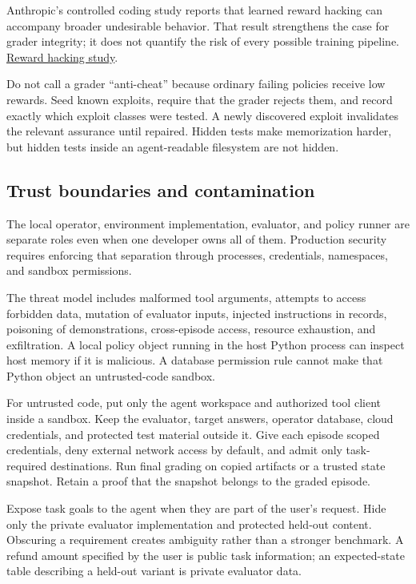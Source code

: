 \documentclass[
  11pt,
  letterpaper,
]{article}
\begin{document}
Anthropic's controlled coding study reports that learned reward hacking
can accompany broader undesirable behavior. That result strengthens the
case for grader integrity; it does not quantify the risk of every
possible training pipeline.
\href{https://www.anthropic.com/research/emergent-misalignment-reward-hacking}{Reward
hacking study}.

Do not call a grader ``anti-cheat'' because ordinary failing policies
receive low rewards. Seed known exploits, require that the grader
rejects them, and record exactly which exploit classes were tested. A
newly discovered exploit invalidates the relevant assurance until
repaired. Hidden tests make memorization harder, but hidden tests inside
an agent-readable filesystem are not hidden.

\subsection{Trust boundaries and
contamination}\label{trust-boundaries-and-contamination}

The local operator, environment implementation, evaluator, and policy
runner are separate roles even when one developer owns all of them.
Production security requires enforcing that separation through
processes, credentials, namespaces, and sandbox permissions.

The threat model includes malformed tool arguments, attempts to access
forbidden data, mutation of evaluator inputs, injected instructions in
records, poisoning of demonstrations, cross-episode access, resource
exhaustion, and exfiltration. A local policy object running in the host
Python process can inspect host memory if it is malicious. A database
permission rule cannot make that Python object an untrusted-code
sandbox.

For untrusted code, put only the agent workspace and authorized tool
client inside a sandbox. Keep the evaluator, target answers, operator
database, cloud credentials, and protected test material outside it.
Give each episode scoped credentials, deny external network access by
default, and admit only task-required destinations. Run final grading on
copied artifacts or a trusted state snapshot. Retain a proof that the
snapshot belongs to the graded episode.

Expose task goals to the agent when they are part of the user's request.
Hide only the private evaluator implementation and protected held-out
content. Obscuring a requirement creates ambiguity rather than a
stronger benchmark. A refund amount specified by the user is public task
information; an expected-state table describing a held-out variant is
private evaluator data.
\end{document}
